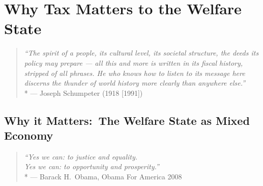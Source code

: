 
\chapter[Tax Matters]{Why Tax Matters to the Welfare State} \label{chap:tax-matters}

\begin{quote}
	\emph{``The spirit of a people, its cultural level, its societal structure, the deeds its policy may prepare --- all this and more is written in its fiscal history, stripped of all phrases.
	He who knows how to listen to its message here discerns the thunder of world history more clearly than anywhere else.''}
	\\*
	--- Joseph Schumpeter (1918 [1991])
\end{quote}




\section{Why it Matters:\ The Welfare State as Mixed Economy} \label{sec:why-mixed-economy-matters}

\begin{quote}
	\emph{``Yes we can:
	to justice and equality.
	\\
	Yes we can:
	to opportunity and prosperity.''}
	\\*
	--- Barack H.\ Obama, Obama For America 2008
\end{quote}



